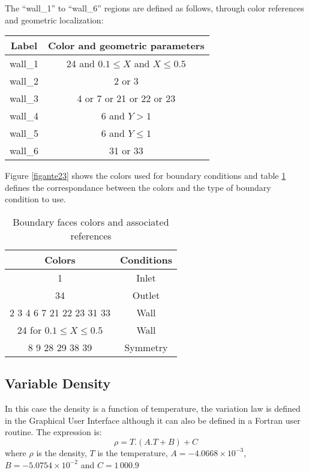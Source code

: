 The ``wall\_1'' to ``wall\_6'' regions are defined as follows, through color
references and geometric localization:
\begin{center}
\begin{tabular}{c|c}
Label & Color and geometric parameters \\
\hline
wall\_1 & 24 and $0.1\leqslant X$ and $X\leqslant 0.5$ \\
wall\_2 & 2 or 3 \\
wall\_3 & 4 or 7 or 21 or 22 or 23 \\
wall\_4 & 6 and $Y>1$ \\
wall\_5 & 6 and $Y\leqslant1$ \\
wall\_6 & 31 or 33 \\
\end{tabular}
\end{center}

Figure \ref{figante23} shows the colors used for boundary conditions and
table \ref{tabante41} defines the correspondance between the colors and
the type of boundary condition to use.

\begin{table}[htp]
\begin{center}
\begin{tabular}{|c|c|}
\hline
Colors & Conditions \\
\hline
1 & Inlet \\
\hline
34 & Outlet \\
\hline
2 3 4 6 7 21 22 23 31 33 & Wall \\
\hline
24 for $0.1 \leq X \leq 0.5$ & Wall \\
\hline
8 9 28 29 38 39 & Symmetry \\
\hline
\end{tabular}
\caption{Boundary faces colors and associated references}
\label{tabante41}
\end{center}
\end{table}

        \subsection{Variable Density}
In this case the density is a function of temperature, the variation law is defined
 in the Graphical User Interface although it can also be defined in a Fortran user 
routine. The expression is:
\begin{equation}
\rho = T.(A.T + B) + C
\end{equation}
where $\rho$ is the density, $T$ is the temperature, $A = -4.0668\times10^{-3}$,
$B =-5.0754\times 10^{-2}$ and $C = 1\,000.9$

